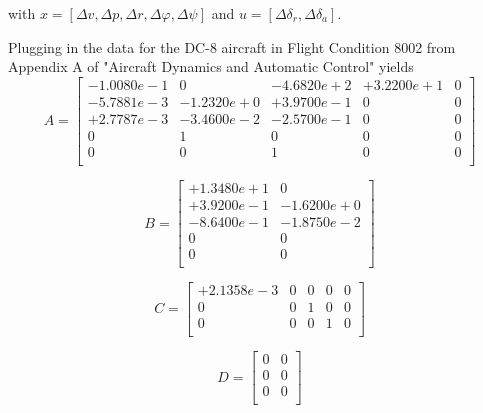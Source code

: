 \documentclass[12pt]{article}
\begin{document}
\noindent with $x = [\Delta v, \Delta p, \Delta r, \Delta \varphi, \Delta \psi]$ and $u =[\Delta \delta_r, \Delta \delta_a]$.

\noindent Plugging in the data for the DC-8 aircraft in Flight Condition 8002 from Appendix A of "Aircraft Dynamics and Automatic Control" yields
\begin{equation*}
A =
\begin{bmatrix}
  -1.0080e-1 &          0 & -4.6820e+2 & +3.2200e+1  &          0 \\
  -5.7881e-3 & -1.2320e+0 & +3.9700e-1 &          0  &          0 \\
  +2.7787e-3 & -3.4600e-2 & -2.5700e-1 &          0  &          0 \\
           0 &          1 &          0 &          0  &          0 \\
           0 &          0 &          1 &          0  &          0 \\

\end{bmatrix}
\end{equation*}

\begin{equation*}
B =
\begin{bmatrix}
  +1.3480e+1 &          0 \\
  +3.9200e-1 & -1.6200e+0 \\
  -8.6400e-1 & -1.8750e-2 \\
           0 &          0 \\
           0 &          0 \\
\end{bmatrix}
\end{equation*}

\begin{equation*}
C =
\begin{bmatrix}
   +2.1358e-3 &           0 &           0  &          0 &           0 \\
            0 &           0 &           1  &          0 &           0 \\
            0 &           0 &           0  &          1 &           0 \\
\end{bmatrix}
\end{equation*}

\begin{equation*}
D =
\begin{bmatrix}
     0  &   0 \\
     0  &   0 \\
     0  &   0 \\
\end{bmatrix}
\end{equation*}
\end{document}
